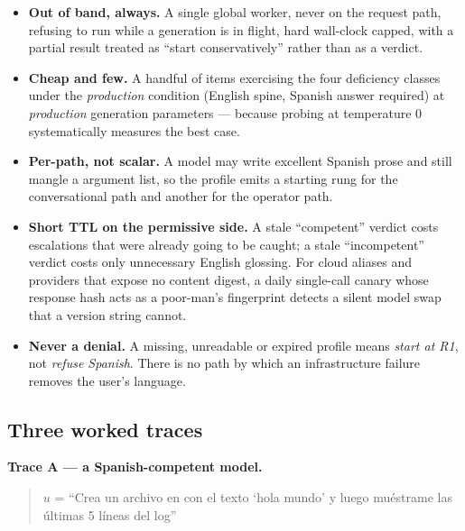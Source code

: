 \begin{itemize}
  \item \textbf{Out of band, always.} A single global worker, never on the request
        path, refusing to run while a generation is in flight, hard wall-clock
        capped, with a partial result treated as ``start conservatively'' rather than
        as a verdict.
  \item \textbf{Cheap and few.} A handful of items exercising the four deficiency
        classes under the \emph{production} condition (English spine, Spanish answer
        required) at \emph{production} generation parameters --- because probing at
        temperature 0 systematically measures the best case.
  \item \textbf{Per-path, not scalar.} A model may write excellent Spanish prose and
        still mangle a  argument list, so the profile emits
        a starting rung for the conversational path and another for the operator path.
  \item \textbf{Short TTL on the permissive side.} A stale ``competent'' verdict costs
        escalations that were already going to be caught; a stale ``incompetent''
        verdict costs only unnecessary English glossing. For cloud aliases and
        providers that expose no content digest, a daily single-call canary whose
        response hash acts as a poor-man's fingerprint detects a silent model swap
        that a version string cannot.
  \item \textbf{Never a denial.} A missing, unreadable or expired profile means
        \emph{start at R1}, not \emph{refuse Spanish}. There is no path by which an
        infrastructure failure removes the user's language.
\end{itemize}

\subsection{Three worked traces}
\label{sec:three-worked-traces}

\textbf{Trace A --- a Spanish-competent model.}

\begin{quote}
$u$ = \foreignlanguage{spanish}{``Crea un archivo en
 con el
texto `hola mundo' y luego muéstrame las últimas 5 líneas del log''}
\end{quote}


